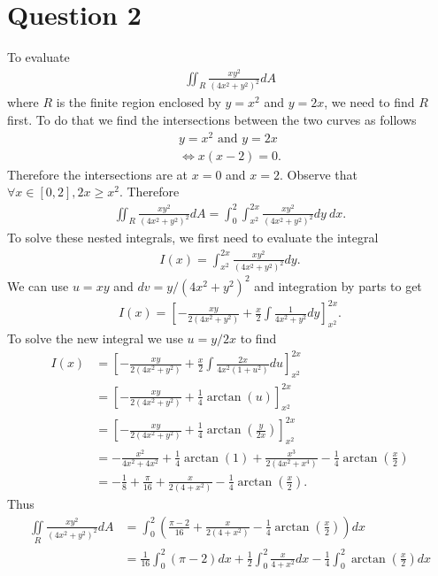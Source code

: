 \documentclass{article}
\newcommand{\di}{\iint\limits}
\begin{document}
\section*{Question 2}
To evaluate
\begin{align*}
  \iint_R\frac{xy^2}{(4x^2+y^2)^2}dA
\end{align*}
where $R$ is the finite region enclosed by $y=x^2$ and $y=2x$,
we need to find $R$ first. To do that we find the intersections between the
two curves as follows
\begin{align*}
  y=x^2 \text{ and } y = 2x\\
  \Leftrightarrow x(x-2)=0.
\end{align*}
Therefore the intersections are at $x=0$ and $x=2$. Observe that
$\forall x\in[0,2], 2x\geq x^2$. Therefore
\begin{align*}
  \iint_R \frac{xy^2}{(4x^2+y^2)^2} dA
  = \int_0^2\int_{x^2}^{2x} \frac{xy^2}{(4x^2+y^2)^2}dy\: dx.
\end{align*}
To solve these nested integrals, we first need to evaluate the
 integral
\begin{align*}
  I(x) = \int_{x^2}^{2x} \frac{xy^2}{(4x^2+y^2)^2}dy.
\end{align*}
We can use $u=xy$ and $dv=y/(4x^2+y^2)^2$ and integration by
parts to get
\begin{align*}
  I(x) = \left[-\frac{xy}{2(4x^2+y^2)}+\frac{x}{2}\int \frac{1}{4x^2+y^2}dy\right]_{x^2}^{2x}.
\end{align*}
To solve the new integral we use $u=y/2x$ to find
\begin{align*}
  I(x) &= \left[-\frac{xy}{2(4x^2+y^2)}+\frac{x}{2}\int \frac{2x}{4x^2(1+u^2)}du\right]_{x^2}^{2x}\\
  &= \left[-\frac{xy}{2(4x^2+y^2)}+\frac{1}{4}\arctan(u)\right]_{x^2}^{2x}\\
  &= \left[-\frac{xy}{2(4x^2+y^2)}+\frac{1}{4}\arctan\left(\frac{y}{2x}\right)\right]_{x^2}^{2x}\\
  &=-\frac{x^2}{4x^2+4x^2}+\frac{1}{4}\arctan(1)+\frac{x^3}{2(4x^2+x^4)}
  -\frac{1}{4}\arctan\left(\frac{x}{2}\right)\\
  &=-\frac{1}{8}+\frac{\pi}{16}+\frac{x}{2(4+x^2)}-\frac{1}{4}\arctan\left(\frac{x}{2}\right).
\end{align*}
Thus
\begin{align*}
  \di_R\frac{xy^2}{(4x^2+y^2)^2}dA&=\int_0^2\left(\frac{\pi-2}{16}+\frac{x}{2(4+x^2)}-\frac{1}{4}\arctan\left(\frac{x}{2}\right)\right)dx\\
  &=\frac{1}{16}\int_0^2(\pi-2)dx+\frac{1}{2}\int_0^2\frac{x}{4+x^2}dx-\frac{1}{4}\int_0^2\arctan\left(\frac{x}{2}\right)dx
\end{align*}
\end{document}
